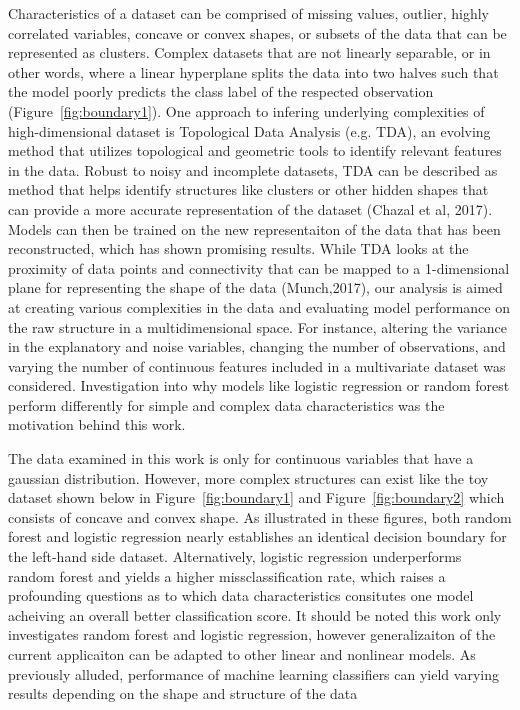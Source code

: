 \documentclass{llncs}
\begin{document}
Characteristics of a dataset can be comprised of missing values, outlier, highly correlated variables, concave or convex shapes, or subsets of the data that can be represented as clusters. Complex datasets that are not linearly separable, or in other words, where a linear hyperplane splits the data into two halves such that the model poorly predicts the class label of the respected observation (Figure~\ref{fig:boundary1}). One approach to infering underlying complexities of high-dimensional dataset is Topological Data Analysis (e.g. TDA), an evolving method that utilizes topological and geometric tools to identify relevant features in the data. Robust to noisy and incomplete datasets, TDA can be described as method that helps identify structures like clusters or other hidden shapes that can provide a more accurate representation of the dataset (Chazal et al, 2017). Models can then be trained on the new representaiton of the data that has been reconstructed, which has shown promising results. While TDA looks at the proximity of data points and connectivity that can be mapped to a 1-dimensional plane for representing the shape of the data (Munch,2017), our analysis is aimed at creating various complexities in the data and evaluating model performance on the raw structure in a multidimensional space. For instance, altering the variance in the explanatory and noise variables, changing the number of observations, and varying the number of continuous features included in a multivariate dataset was considered. Investigation into why models like logistic regression or random forest perform differently for simple and complex data characteristics was the motivation behind this work.


The data examined in this work is only for continuous variables that have a gaussian distribution. However, more complex structures can exist like the toy dataset shown below in Figure~\ref{fig:boundary1} and Figure~\ref{fig:boundary2} which consists of concave and convex shape. As illustrated in these figures, both random forest and logistic regression nearly establishes an identical decision boundary for the left-hand side dataset. Alternatively, logistic regression underperforms random forest and yields a higher missclassification rate, which raises a profounding questions as to which data characteristics consitutes one model acheiving an overall better classification score. It should be noted this work only investigates random forest and logistic regression, however generalizaiton of the current applicaiton can be adapted to other linear and nonlinear models. As previously alluded, performance of machine learning classifiers can yield varying results depending on the shape and structure of the data
\end{document}
